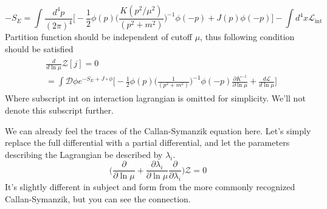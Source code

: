 \documentclass[12pt,halfline,a4paper]{ouparticle}
\begin{document}
\begin{equation}
	-S_E=\int \frac{d^4p}{(2\pi)^4}\big[-\frac{1}{2}\phi(p)\bigg(\frac{K(p^2/\mu^2)}{(p^2+m^2)}\bigg)^{-1}\phi(-p)+J(p)\phi(-p)\big]-\int d^4x \mathcal L_\text{int}
\end{equation}
Partition function should be independent of cutoff $\mu$, thus following condition should be satisfied
\begin{align}\begin{split}
	\label{eq:floweq}
	&\frac{d}{d\ln\mu}\mathcal Z[j]=0\\
	&=\int\mathcal D \phi e^{-S_E+J\circ\phi}\bigg[-\frac{1}{2}\phi(p)\bigg(\frac{1}{(p^2+m^2)}\bigg)^{-1}\phi(-p)\frac{\partial K^{-1}}{\partial\ln \mu}+\frac{d \mathcal L}{d\ln \mu}\bigg]
\end{split}\end{align}
Where subscript int on interaction lagrangian is omitted for simplicity. We'll not denote this subscript further. 

We can already feel the traces of the Callan-Symanzik equation here. 
Let's simply replace the full differential with a partial differential, and let the parameters describing the Lagrangian be described by $\lambda_i$. 
\begin{equation}
\bigg(\frac{\partial }{\partial \ln \mu}+\frac{\partial \lambda_i}{\partial \ln \mu}\frac{\partial}{\partial \lambda_i}\bigg)\mathcal Z=0
\end{equation}
It's slightly different in subject and form from the more commonly recognized Callan-Symanzik, but you can see the connection.
\end{document}
